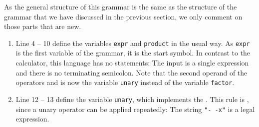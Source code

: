 \noindent
As the general structure of this grammar is the same as the structure of the grammar that we have
discussed in the previous section, we only comment on those parts that are new.
\begin{enumerate}
\item Line 4 -- 10 define the variables \texttt{expr} and \texttt{product} in the usual way.  As
      \texttt{expr} is the first variable of the grammar, it is the start symbol.  In contrast to the
      calculator, this language has no statements:  The input is a single expression and there is no
      terminating semicolon.  Note that the second operand of the operators \squoted{*} and \squoted{/} is
      now the variable \texttt{unary} instead of the variable \texttt{factor}.
\item Line 12 -- 13 define the variable \texttt{unary}, which implements the .  This rule
      is , since a unary operator can be applied repeatedly:  The string
      \texttt{"-\,-x"} is a legal expression.


\end{enumerate}
